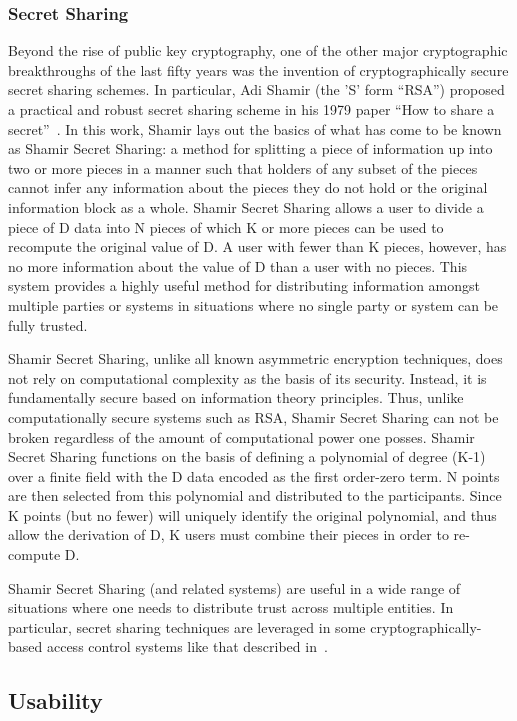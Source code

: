 \subsubsection{Secret Sharing}

Beyond the rise of public key cryptography, one of the other major
cryptographic breakthroughs of the last fifty years was the invention
of cryptographically secure secret sharing schemes. In particular, Adi
Shamir (the 'S' form ``RSA'') proposed a practical and robust secret
sharing scheme in his 1979 paper ``How to share a
secret''~\cite{Shamir1979}. In this work, Shamir lays out the basics
of what has come to be known as Shamir Secret Sharing: a method for
splitting a piece of information up into two or more pieces in a
manner such that holders of any subset of the pieces cannot infer any
information about the pieces they do not hold or the original
information block as a whole. Shamir Secret Sharing allows a user to
divide a piece of D data into N pieces of which K or more pieces can
be used to recompute the original value of D. A user with fewer than K
pieces, however, has no more information about the value of D than a
user with no pieces. This system provides a highly useful method for
distributing information amongst multiple parties or systems in
situations where no single party or system can be fully trusted.

Shamir Secret Sharing, unlike all known asymmetric encryption
techniques, does not rely on computational complexity as the basis of
its security. Instead, it is fundamentally secure based on information
theory principles. Thus, unlike computationally secure systems such as
RSA, Shamir Secret Sharing can not be broken regardless of the amount
of computational power one posses. Shamir Secret Sharing functions on
the basis of defining a polynomial of degree (K-1) over a finite field
with the D data encoded as the first order-zero term. N points are
then selected from this polynomial and distributed to the
participants. Since K points (but no fewer) will uniquely identify the
original polynomial, and thus allow the derivation of D, K users must
combine their pieces in order to re-compute D.

Shamir Secret Sharing (and related systems) are useful in a wide range
of situations where one needs to distribute trust across multiple
entities. In particular, secret sharing techniques are leveraged in
some cryptographically-based access control systems like that
described in~\cite{Goyal2006}.

\subsection{Usability}

